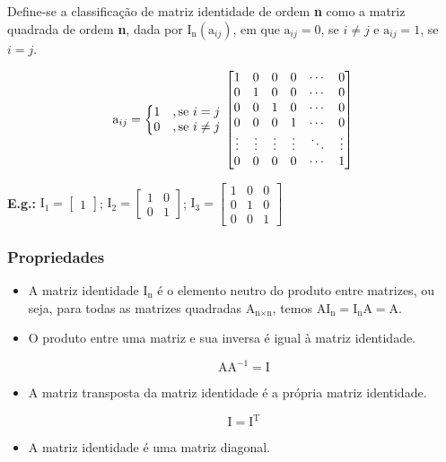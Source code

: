 \documentclass[a4paper,12pt]{article}
\begin{document}
Define-se a classificação de matriz identidade de ordem \textbf{n} como a matriz quadrada de ordem \textbf{n}, dada por $ \text{I}_{\text{n}}  (\text{a}_{ij}) $, em que $ \text{a}_{ij} = 0$, se $ i \neq j $ e $ \text{a}_{ij} = 1 $, se $ i = j $.

$$  \text{a}_{ij} = \left\{\begin{matrix}
1 &,\text{se } i = j
\\ 
0 &,\text{se } i\ne j
\end{matrix}\right. \\
\begin{bmatrix} 
1 & 0 & 0 & 0 & \cdots & 0 \\ 0 & 1 & 0 & 0 & \cdots & 0 \\ 0 & 0 & 1 & 0 & \cdots & 0 \\ 0 & 0 & 0 & 1 & \cdots & 0 \\ \vdots & \vdots & \vdots & \vdots & \ddots & \vdots  \\ 0 & 0 & 0 & 0 & \cdots & 1 
\end{bmatrix} $$

\textbf{E.g.:} $ \text{I}_1 = \begin{bmatrix}
1
\end{bmatrix}$; $ \text{I}_2 = \begin{bmatrix}
1 & 0 \\
0 & 1
\end{bmatrix}$; $ \text{I}_3 = \begin{bmatrix}
1 & 0 & 0 \\
0 & 1 & 0 \\
0 & 0 & 1
\end{bmatrix}$

\subsubsection{Propriedades}

\begin{itemize}

    \item A matriz identidade $ \text{I}_{\text{n}} $ é o elemento neutro do produto entre matrizes, ou seja, para todas as matrizes quadradas $ \text{A}_{\text{n} \times \text{n}} $, temos $ \text{A}\text{I}_{\text{n}} = \text{I}_{\text{n}} \text{A} = \text{A} $.
    
    \item O produto entre uma matriz e sua inversa é igual à matriz identidade.
    
    $$ \text{A} \text{A}^{-1} = \text{I} $$
    
    \item A matriz transposta da matriz identidade é a própria matriz identidade.
    
    $$ \text{I} = \text{I}^{\text{T}} $$
    
    \item A matriz identidade é uma matriz diagonal.
    
\end{itemize}
\end{document}
